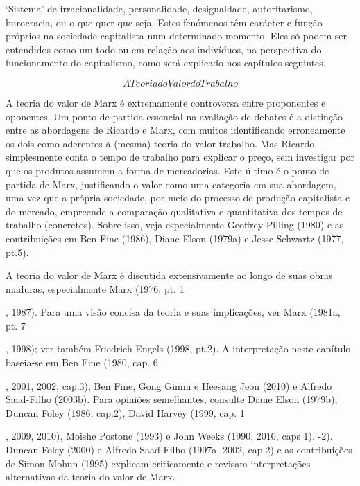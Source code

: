 ‘Sistema’ de irracionalidade, personalidade, desigualdade, autoritarismo, burocracia, ou o que quer que seja. Estes fenómenos têm carácter e função próprios na sociedade capitalista num determinado momento. Eles só podem ser entendidos como um todo ou em relação aos indivíduos, na perspectiva do funcionamento do capitalismo, como será explicado nos capítulos seguintes.
 \par 
\[A Teoria do Valor do Trabalho\]
 \par 
A teoria do valor de Marx é extremamente controversa entre proponentes e oponentes. Um ponto de partida essencial na avaliação de debates é a distinção entre as abordagens de Ricardo e Marx, com muitos identificando erroneamente os dois como aderentes à (mesma) teoria do valor-trabalho. Mas Ricardo simplesmente conta o tempo de trabalho para explicar o preço, sem investigar por que os produtos assumem a forma de mercadorias. Este último é o ponto de partida de Marx, justificando o valor como uma categoria em sua abordagem, uma vez que a própria sociedade, por meio do processo de produção capitalista e do mercado, empreende a comparação qualitativa e quantitativa dos tempos de trabalho (concretos). Sobre isso, veja especialmente Geoffrey Pilling (1980) e as contribuições em Ben Fine (1986), Diane Elson (1979a) e Jesse Schwartz (1977, pt.{\color{blue}5}).
 \par 
A teoria do valor de Marx é discutida extensivamente ao longo de suas obras maduras, especialmente Marx (1976, pt. {\color{blue} 1 } {\par} , 1987). Para uma visão concisa da teoria e suas implicações, ver Marx (1981a, pt. {\color{blue} 7 } {\par} , 1998); ver também Friedrich Engels (1998, pt.{\color{blue}2}). A interpretação neste capítulo baseia-se em Ben Fine (1980, cap. {\color{blue} 6 } {\par} , 2001, 2002, cap.{\color{blue}3}), Ben Fine, Gong Gimm e Heesang Jeon (2010) e Alfredo Saad-Filho (2003b). Para opiniões semelhantes, consulte Diane Elson (1979b), Duncan Foley (1986, cap.{\color{blue}2}), David Harvey (1999, cap. {\color{blue} 1 } {\par} , 2009, 2010), Moishe Postone (1993) e John Weeks (1990, 2010, caps {\color{blue}1}). -2). Duncan Foley (2000) e Alfredo Saad-Filho (1997a, 2002, cap.{\color{blue}2}) e as contribuições de Simon Mohun (1995) explicam criticamente e revisam interpretações alternativas da teoria do valor de Marx.